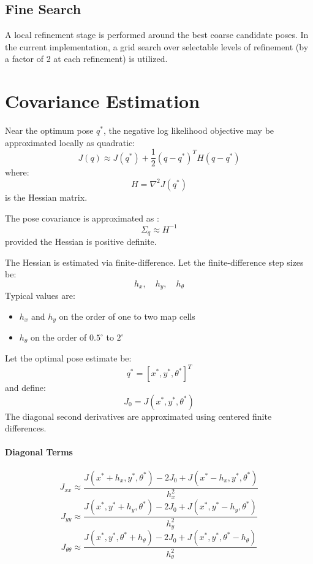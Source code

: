 \documentclass[11pt]{article}
\begin{document}
\subsection{Fine Search}

A local refinement stage is performed around the best coarse candidate poses. In the current implementation, a grid search over selectable levels of refinement (by a factor of 2 at each refinement) is utilized.

\section{Covariance Estimation}

Near the optimum pose $q^*$, the negative log likelihood objective may be approximated locally as quadratic:
\begin{equation}
J(q)
\approx
J(q^*)
+
\frac{1}{2}
(q-q^*)^T H (q-q^*)
\end{equation}
where:
\begin{equation}
H
=
\nabla^2 J(q^*)
\end{equation}
is the Hessian matrix.

The pose covariance is approximated as \cite{wikipedia_observed_information}:
\begin{equation}
\Sigma_q
\approx
H^{-1}
\end{equation}
provided the Hessian is positive definite. 

The Hessian is estimated via finite-difference. Let the finite-difference step sizes be:
\begin{equation}
h_x,\quad h_y,\quad h_\theta
\end{equation}
Typical values are:
\begin{itemize}
    \item $h_x$ and $h_y$ on the order of one to two map cells
    \item $h_\theta$ on the order of $0.5^\circ$ to $2^\circ$
\end{itemize}
Let the optimal pose estimate be:
\begin{equation}
q^* = [x^*, y^*, \theta^*]^T
\end{equation}
and define:
\begin{equation}
J_0 = J(x^*, y^*, \theta^*)
\end{equation}
The diagonal second derivatives are approximated using centered
finite differences.
\paragraph{Diagonal Terms}
\begin{equation}
J_{xx}
\approx
\frac{
J(x^*+h_x,y^*,\theta^*)
-
2J_0
+
J(x^*-h_x,y^*,\theta^*)
}{
h_x^2
}
\end{equation}
\begin{equation}
J_{yy}
\approx
\frac{
J(x^*,y^*+h_y,\theta^*)
-
2J_0
+
J(x^*,y^*-h_y,\theta^*)
}{
h_y^2
}
\end{equation}
\begin{equation}
J_{\theta\theta}
\approx
\frac{
J(x^*,y^*,\theta^*+h_\theta)
-
2J_0
+
J(x^*,y^*,\theta^*-h_\theta)
}{
h_\theta^2
}
\end{equation}
\end{document}
